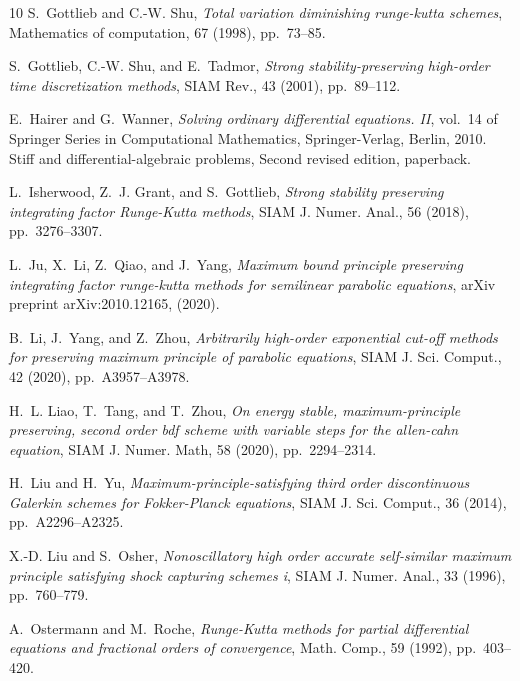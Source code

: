 \documentclass[10pt,final,leqno,onefignum,onetabnum]{siamltex}%
\begin{document}
\begin{thebibliography}{10}
{\sc S.~Gottlieb and C.-W. Shu}, {\em Total variation diminishing runge-kutta
  schemes}, Mathematics of computation, 67 (1998), pp.~73--85.

{\sc S.~Gottlieb, C.-W. Shu, and E.~Tadmor}, {\em Strong stability-preserving
  high-order time discretization methods}, SIAM Rev., 43 (2001), pp.~89--112.

{\sc E.~Hairer and G.~Wanner}, {\em Solving ordinary differential equations.
  {II}}, vol.~14 of Springer Series in Computational Mathematics,
  Springer-Verlag, Berlin, 2010.
\newblock Stiff and differential-algebraic problems, Second revised edition,
  paperback.

{\sc L.~Isherwood, Z.~J. Grant, and S.~Gottlieb}, {\em Strong stability
  preserving integrating factor {R}unge-{K}utta methods}, SIAM J. Numer. Anal.,
  56 (2018), pp.~3276--3307.

{\sc L.~Ju, X.~Li, Z.~Qiao, and J.~Yang}, {\em Maximum bound principle
  preserving integrating factor runge-kutta methods for semilinear parabolic
  equations}, arXiv preprint arXiv:2010.12165,  (2020).

{\sc B.~Li, J.~Yang, and Z.~Zhou}, {\em Arbitrarily high-order exponential
  cut-off methods for preserving maximum principle of parabolic equations},
  SIAM J. Sci. Comput., 42 (2020), pp.~A3957--A3978.

{\sc H.~L. Liao, T.~Tang, and T.~Zhou}, {\em On energy stable,
  maximum-principle preserving, second order bdf scheme with variable steps for
  the allen-cahn equation}, SIAM J. Numer. Math, 58 (2020), pp.~2294--2314.

{\sc H.~Liu and H.~Yu}, {\em Maximum-principle-satisfying third order
  discontinuous {G}alerkin schemes for {F}okker-{P}lanck equations}, SIAM J.
  Sci. Comput., 36 (2014), pp.~A2296--A2325.

{\sc X.-D. Liu and S.~Osher}, {\em Nonoscillatory high order accurate
  self-similar maximum principle satisfying shock capturing schemes i}, SIAM J.
  Numer. Anal., 33 (1996), pp.~760--779.

{\sc A.~Ostermann and M.~Roche}, {\em Runge-{K}utta methods for partial
  differential equations and fractional orders of convergence}, Math. Comp., 59
  (1992), pp.~403--420.


\end{thebibliography}
\end{document}
